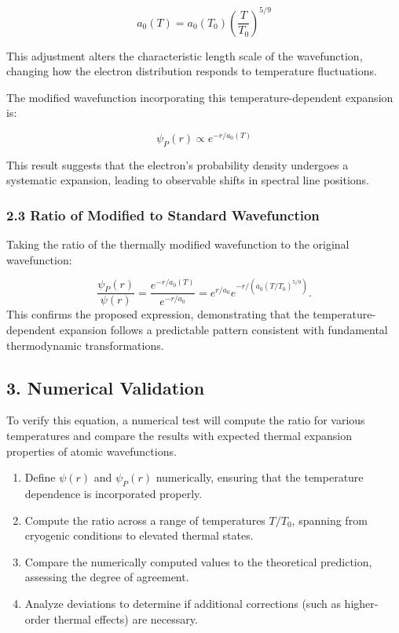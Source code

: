 \documentclass[a4paper,10pt]{article}
\begin{document}
\[ a_0(T) = a_0 (T_0) \left( \frac{T}{T_0} \right)^{5/9} \]

This adjustment alters the characteristic length scale of the wavefunction, changing how the electron distribution responds to temperature fluctuations.

The modified wavefunction incorporating this temperature-dependent expansion is:

\[ \psi_P(r) \propto e^{-r/a_0(T)} \]

This result suggests that the electron's probability density undergoes a systematic expansion, leading to observable shifts in spectral line positions.


\subsubsection*{2.3 Ratio of Modified to Standard Wavefunction}

Taking the ratio of the thermally modified wavefunction to the original wavefunction:

\[
\frac{\psi_P(r)}{\psi(r)} = \frac{e^{-r/a_0(T)}}{e^{-r/a_0}} = e^{r/a_0} e^{-r / (a_0 (T/T_0)^{5/9})}.
\]
This confirms the proposed expression, demonstrating that the temperature-dependent expansion follows a predictable pattern consistent with fundamental thermodynamic transformations.

\subsection*{3. Numerical Validation}

To verify this equation, a numerical test will compute the ratio for various temperatures and compare the results with expected thermal expansion properties of atomic wavefunctions.

\begin{enumerate}
    \item Define \(\psi(r)\) and \(\psi_P(r)\) numerically, ensuring that the temperature dependence is incorporated properly.
    \item Compute the ratio across a range of temperatures \(T/T_0\), spanning from cryogenic conditions to elevated thermal states.
\item Compare the numerically computed values to the theoretical prediction, assessing the degree of agreement.
\item Analyze deviations to determine if additional corrections (such as higher-order thermal effects) are necessary.
\end{enumerate}
\end{document}
